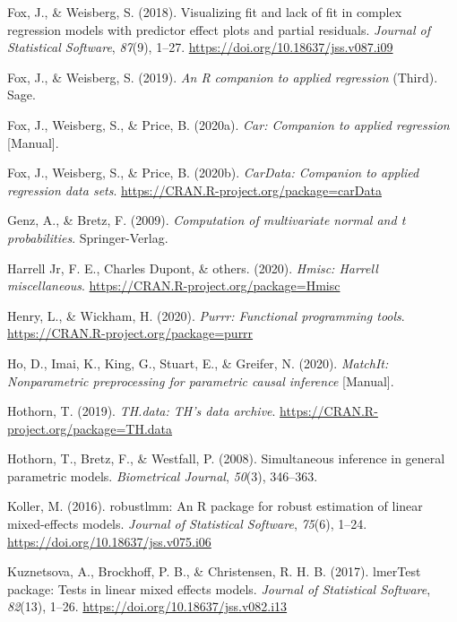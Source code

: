 \documentclass[
  english,
  man, noextraspace]{apa7}
\begin{document}
\begin{appendix}
\leavevmode\hypertarget{ref-R-effects_a}{}%
Fox, J., \& Weisberg, S. (2018). Visualizing fit and lack of fit in
complex regression models with predictor effect plots and partial
residuals. \emph{Journal of Statistical Software}, \emph{87}(9), 1--27.
\url{https://doi.org/10.18637/jss.v087.i09}

\leavevmode\hypertarget{ref-car2019}{}%
Fox, J., \& Weisberg, S. (2019). \emph{An R companion to applied
regression} (Third). Sage.

\leavevmode\hypertarget{ref-R-car}{}%
Fox, J., Weisberg, S., \& Price, B. (2020a). \emph{Car: Companion to
applied regression} {[}Manual{]}.

\leavevmode\hypertarget{ref-R-carData}{}%
Fox, J., Weisberg, S., \& Price, B. (2020b). \emph{CarData: Companion to
applied regression data sets}.
\url{https://CRAN.R-project.org/package=carData}

\leavevmode\hypertarget{ref-R-mvtnorm}{}%
Genz, A., \& Bretz, F. (2009). \emph{Computation of multivariate normal
and t probabilities}. Springer-Verlag.

\leavevmode\hypertarget{ref-R-Hmisc}{}%
Harrell Jr, F. E., Charles Dupont, \& others. (2020). \emph{Hmisc:
Harrell miscellaneous}. \url{https://CRAN.R-project.org/package=Hmisc}

\leavevmode\hypertarget{ref-R-purrr}{}%
Henry, L., \& Wickham, H. (2020). \emph{Purrr: Functional programming
tools}. \url{https://CRAN.R-project.org/package=purrr}

\leavevmode\hypertarget{ref-R-MatchIt}{}%
Ho, D., Imai, K., King, G., Stuart, E., \& Greifer, N. (2020).
\emph{MatchIt: Nonparametric preprocessing for parametric causal
inference} {[}Manual{]}.

\leavevmode\hypertarget{ref-R-TH.data}{}%
Hothorn, T. (2019). \emph{TH.data: TH's data archive}.
\url{https://CRAN.R-project.org/package=TH.data}

\leavevmode\hypertarget{ref-R-multcomp}{}%
Hothorn, T., Bretz, F., \& Westfall, P. (2008). Simultaneous inference
in general parametric models. \emph{Biometrical Journal}, \emph{50}(3),
346--363.

\leavevmode\hypertarget{ref-R-robustlmm}{}%
Koller, M. (2016). robustlmm: An R package for robust estimation of
linear mixed-effects models. \emph{Journal of Statistical Software},
\emph{75}(6), 1--24. \url{https://doi.org/10.18637/jss.v075.i06}

\leavevmode\hypertarget{ref-R-lmerTest}{}%
Kuznetsova, A., Brockhoff, P. B., \& Christensen, R. H. B. (2017).
lmerTest package: Tests in linear mixed effects models. \emph{Journal of
Statistical Software}, \emph{82}(13), 1--26.
\url{https://doi.org/10.18637/jss.v082.i13}


\end{appendix}
\end{document}

